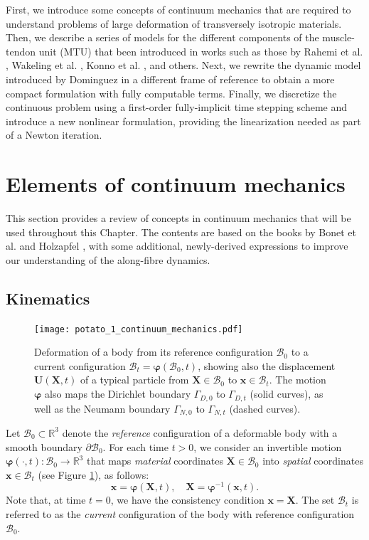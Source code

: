 \documentclass{sfuthesis}
\numberwithin{equation}{section}
\numberwithin{figure}{chapter}
\numberwithin{table}{chapter}
\theoremstyle{definition}
\def\*#1{{\mathbf{#1}}} %
\newcommand{\R}{\mathbb{R}}
\newcommand{\B}{\mathcal{B}}
\def\bphi{{\bm{\varphi}}}
\begin{document}
First, we introduce some concepts of continuum mechanics that are required to understand problems of large deformation of transversely isotropic materials. Then, we describe a series of models for the different components of the muscle-tendon unit (MTU) that been introduced in works such as those by Rahemi et al. \cite{RahemiNigamWakeling2015}, Wakeling et al. \cite{Paper1_WakelingEtAl2020}, Konno et al. \cite{KonnoNigamWakeling2021_ECM}, and others. Next, we rewrite the dynamic model introduced by Dominguez \cite{Seba} in a different frame of reference to obtain a more compact formulation with fully computable terms. Finally, we discretize the continuous problem using a first-order fully-implicit time stepping scheme and introduce a new nonlinear formulation, providing the linearization needed as part of a Newton iteration.

\section{Elements of continuum mechanics}

This section provides a review of concepts in continuum mechanics that will be used throughout this Chapter. The contents are based on the books by Bonet et al. \cite{BonetGillWood2021Book} and Holzapfel \cite{HolzapfelBook}, with some additional, newly-derived expressions to improve our understanding of the along-fibre dynamics.

\subsection{Kinematics} \label{sec:kinematics}

\begin{figure}
    \centering
    \texttt{[image: potato\_1\_continuum\_mechanics.pdf]}
    \caption{Deformation of a body from its reference configuration $\B_0$ to a current configuration $\B_t = \bm{\varphi}(\B_0, t)$, showing also the displacement $\*U(\*X,t)$ of a typical particle from $\*X \in \B_0$ to $\*x \in \B_t$. The motion $\bm{\varphi}$ also maps the Dirichlet boundary $\Gamma_{D,0}$ to $\Gamma_{D,t}$ (solid curves), as well as the Neumann boundary $\Gamma_{N,0}$ to $\Gamma_{N,t}$ (dashed curves). \label{fig:potato_B0_Bt}}
\end{figure}

Let $\B_0 \subset \R^3$ denote the \textit{reference} configuration of a deformable body with a smooth boundary $\partial \B_0$. For each time $t > 0$, we consider an invertible motion $\bphi(\cdot, t):\B_0 \to \R^3$ that maps \textit{material} coordinates $\*X \in \B_0$ into \textit{spatial} coordinates $\*x \in \B_t$ (see Figure \ref{fig:potato_B0_Bt}), as follows:
\begin{equation}
\*x = \bphi(\*X,t), \quad \*X = \bphi^{-1}(\*x,t).
\end{equation}
Note that, at time $t=0$, we have the consistency condition $\*x = \*X$. The set $\B_t$ is referred to as the \textit{current} configuration of the body with reference configuration $\B_0$.
\end{document}

